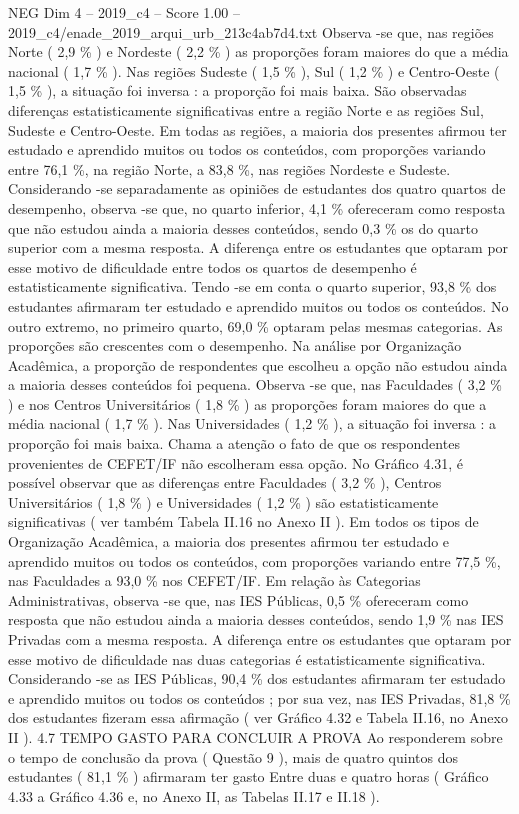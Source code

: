 \begin{textsample}{NEG Dim 4 – 2019\_c4 – Score 1.00 – 2019\_c4/enade\_2019\_arqui\_urb\_213c4ab7d4.txt}
Observa -se que, nas regiões Norte ( 2,9 \% ) e Nordeste ( 2,2 \% ) as proporções foram maiores do que a média nacional ( 1,7 \% ).
Nas regiões Sudeste ( 1,5 \% ), Sul ( 1,2 \% ) e Centro-Oeste ( 1,5 \% ), a situação foi inversa : a proporção foi mais baixa.
São observadas diferenças estatisticamente significativas entre a região Norte e as regiões Sul, Sudeste e Centro-Oeste.
Em todas as regiões, a maioria dos presentes afirmou ter estudado e aprendido muitos ou todos os conteúdos, com proporções variando entre 76,1 \%, na região Norte, a 83,8 \%, nas regiões Nordeste e Sudeste.
Considerando -se separadamente as opiniões de estudantes dos quatro quartos de desempenho, observa -se que, no quarto inferior, 4,1 \% ofereceram como resposta que não estudou ainda a maioria desses conteúdos, sendo 0,3 \% os do quarto superior com a mesma resposta.
A diferença entre os estudantes que optaram por esse motivo de dificuldade entre todos os quartos de desempenho é estatisticamente significativa.
Tendo -se em conta o quarto superior, 93,8 \% dos estudantes afirmaram ter estudado e aprendido muitos ou todos os conteúdos.
No outro extremo, no primeiro quarto, 69,0 \% optaram pelas mesmas categorias.
As proporções são crescentes com o desempenho.
Na análise por Organização Acadêmica, a proporção de respondentes que escolheu a opção não estudou ainda a maioria desses conteúdos foi pequena.
Observa -se que, nas Faculdades ( 3,2 \% ) e nos Centros Universitários ( 1,8 \% ) as proporções foram maiores do que a média nacional ( 1,7 \% ).
Nas Universidades ( 1,2 \% ), a situação foi inversa : a proporção foi mais baixa.
Chama a atenção o fato de que os respondentes provenientes de CEFET/IF não escolheram essa opção.
No Gráfico 4.31, é possível observar que as diferenças entre Faculdades ( 3,2 \% ), Centros Universitários ( 1,8 \% ) e Universidades ( 1,2 \% ) são estatisticamente significativas ( ver também Tabela II.16 no Anexo II ).
Em todos os tipos de Organização Acadêmica, a maioria dos presentes afirmou ter estudado e aprendido muitos ou todos os conteúdos, com proporções variando entre 77,5 \%, nas Faculdades a 93,0 \% nos CEFET/IF.
Em relação às Categorias Administrativas, observa -se que, nas IES Públicas, 0,5 \% ofereceram como resposta que não estudou ainda a maioria desses conteúdos, sendo 1,9 \% nas IES Privadas com a mesma resposta.
A diferença entre os estudantes que optaram por esse motivo de dificuldade nas duas categorias é estatisticamente significativa.
Considerando -se as IES Públicas, 90,4 \% dos estudantes afirmaram ter estudado e aprendido muitos ou todos os conteúdos ; por sua vez, nas IES Privadas, 81,8 \% dos estudantes fizeram essa afirmação ( ver Gráfico 4.32 e Tabela II.16, no Anexo II ). 4.7 TEMPO GASTO PARA CONCLUIR A PROVA Ao responderem sobre o tempo de conclusão da prova ( Questão 9 ), mais de quatro quintos dos estudantes ( 81,1 \% ) afirmaram ter gasto Entre duas e quatro horas ( Gráfico 4.33 a Gráfico 4.36 e, no Anexo II, as Tabelas II.17 e II.18 ).

\end{textsample}
